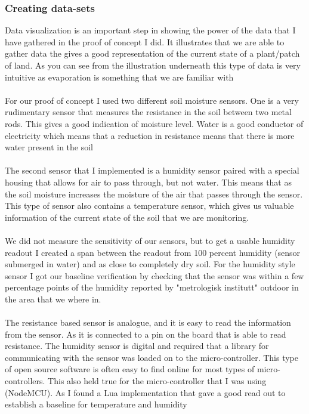 \documentclass[]{uiophd}
\begin{document}
\subsubsection{Creating data-sets}
Data visualization is an important step in showing the power of the data that I have gathered in the proof of concept I did. It illustrates that we are able to gather data the gives a good representation of the current state of a plant/patch of land. As you can see from the illustration underneath this type of data is very intuitive as evaporation is something that we are familiar with
\\\\
For our proof of concept I used two different soil moisture sensors. One is a very rudimentary sensor that measures the resistance in the soil between two metal rods. This gives a good indication of moisture level. Water is a good conductor of electricity which means that a reduction in resistance means that there is more water present in the soil
\\\\
The second sensor that I implemented is a humidity sensor paired with a special housing that allows for air to pass through, but not water. This means that as the soil moisture increases the moisture of the air that passes through the sensor. This type of sensor also contains a temperature sensor, which gives us valuable information of the current state of the soil that we are monitoring.
\\\\
We did not measure the sensitivity of our sensors, but to get a usable humidity readout I created a span between the readout from 100 percent humidity (sensor submerged in water) and as close to completely dry soil. For the humidity style sensor I got our baseline verification by checking that the sensor was within a few percentage points of the humidity reported by "metrologisk institutt" outdoor in the area that we where in.
\\\\
The resistance based sensor is analogue, and it is easy to read the information from the sensor. As it is connected to a pin on the board that is able to read resistance. The humidity sensor is digital and required that a library for communicating with the sensor was loaded on to the micro-controller. This type of open source software is often easy to find online for most types of micro-controllers. This also held true for the micro-controller that I was using (NodeMCU). As I found a Lua implementation that gave a good read out to establish a baseline for temperature and humidity
\end{document}
